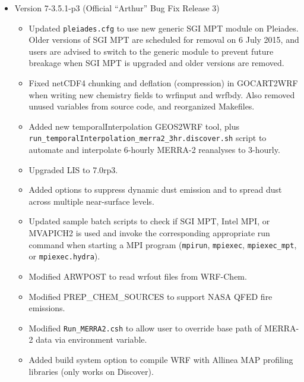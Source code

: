 \begin{itemize}
\item Version 7-3.5.1-p3 (Official ``Arthur'' Bug Fix Release 3)
  \begin{itemize}
    \item Updated \texttt{pleiades.cfg} to use new generic SGI MPT module on
      Pleiades. Older versions of SGI MPT are scheduled for removal on 6 July
      2015, and users are advised to switch to the generic module to prevent
      future breakage when SGI MPT is upgraded and older versions are removed.
    \item Fixed netCDF4 chunking and deflation (compression) in GOCART2WRF
      when writing new chemistry fields to wrfinput and wrfbdy. Also removed
      unused variables from source code, and reorganized Makefiles.
    \item Added new temporalInterpolation GEOS2WRF tool, plus\\ 
      \texttt{run\_temporalInterpolation\_merra2\_3hr.discover.sh} script to
      automate and interpolate 6-hourly MERRA-2 reanalyses to 3-hourly.
    \item Upgraded LIS to 7.0rp3.
    \item Added options to suppress dynamic dust emission and to spread dust
      across multiple near-surface levels.
    \item Updated sample batch scripts to check if SGI MPT, Intel MPI, or
      MVAPICH2 is used and invoke the corresponding appropriate run command 
      when starting a MPI program (\texttt{mpirun}, \texttt{mpiexec}, 
     \texttt{mpiexec\_mpt}, or \texttt{mpiexec.hydra}).
    \item Modified ARWPOST to read wrfout files from WRF-Chem.
    \item Modified PREP\_CHEM\_SOURCES to support NASA QFED fire emissions.
    \item Modified \texttt{Run\_MERRA2.csh} to allow user to override base 
      path of MERRA-2 data via environment variable.
    \item Added build system option to compile WRF with Allinea MAP profiling
      libraries (only works on Discover).
  \end{itemize}


\end{itemize}
